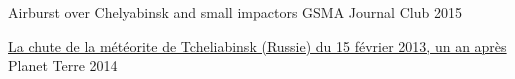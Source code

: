
\begin{cvhonors}

	\cvhonor
	{Airburst over Chelyabinsk and small impactors}
	{}
	{GSMA Journal Club}
	{2015}

	\cvhonor
	{\href{{http://planet-terre.ens-lyon.fr/article/meteorite-Tcheliabinsk.xml}}{La chute de la météorite de Tcheliabinsk (Russie) du 15 février 2013, un an après}}
	{}
	{Planet Terre}
	{2014}

\end{cvhonors}
